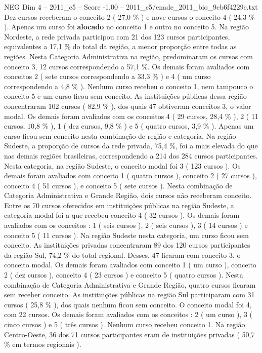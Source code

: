 \begin{textsample}{NEG Dim 4 – 2011\_c5 – Score -1.00 – 2011\_c5/enade\_2011\_bio\_9cb6f4229e.txt}
Dez cursos receberam o conceito 2 ( 27,0 \% ) e nove cursos o conceito 4 ( 24,3 \% ).
Apenas um curso foi \textbf{alocado} no conceito 1 e outro no conceito 5.
Na região Nordeste, a rede privada participou com 21 dos 123 cursos participantes, equivalentes a 17,1 \% do total da região, a menor proporção entre todas as regiões.
Nesta Categoria Administrativa na região, predominaram os cursos com conceito 3, 12 cursos correspondendo a 57,1 \%.
Os demais foram avaliados com conceitos 2 ( sete cursos correspondendo a 33,3 \% ) e 4 ( um curso correspondendo a 4,8 \% ).
Nenhum curso recebeu o conceito 1, nem tampouco o conceito 5 e um curso ficou sem conceito.
As instituições públicas dessa região concentraram 102 cursos ( 82,9 \% ), dos quais 47 obtiveram conceitos 3, o valor modal.
Os demais foram avaliados com os conceitos 4 ( 29 cursos, 28,4 \% ), 2 ( 11 cursos, 10,8 \% ), 1 ( dez cursos, 9,8 \% ) e 5 ( quatro cursos, 3,9 \% ).
Apenas um curso ficou sem conceito nesta combinação de região e categoria.
Na região Sudeste, a proporção de cursos da rede privada, 75,4 \%, foi a mais elevada do que nas demais regiões brasileiras, correspondendo a 214 dos 284 cursos participantes.
Nesta categoria, na região Sudeste, o conceito modal foi 3 ( 123 cursos ).
Os demais foram avaliados com conceito 1 ( quatro cursos ), conceito 2 ( 27 cursos ), conceito 4 ( 51 cursos ), e conceito 5 ( sete cursos ).
Nesta combinação de Categoria Administrativa e Grande Região, dois cursos não receberam conceito.
Entre os 70 cursos oferecidos em instituições públicas na região Sudeste, a categoria modal foi a que recebeu conceito 4 ( 32 cursos ).
Os demais foram avaliados com os conceitos : 1 ( seis cursos ), 2 ( seis cursos ), 3 ( 14 cursos ) e conceito 5 ( 11 cursos ).
Na região Sudeste nesta categoria, um curso ficou sem conceito.
As instituições privadas concentraram 89 dos 120 cursos participantes da região Sul, 74,2 \% do total regional.
Desses, 47 ficaram com conceito 3, o conceito modal.
Os demais foram avaliados com conceito 1 ( um curso ), conceito 2 ( dez cursos ), conceito 4 ( 23 cursos ) e conceito 5 ( quatro cursos ).
Nesta combinação de Categoria Administrativa e Grande Região, quatro cursos ficaram sem receber conceito.
As instituições públicas na região Sul participaram com 31 cursos ( 25,8 \% ), dos quais nenhum ficou sem conceito.
O conceito modal foi 4, com 22 cursos.
Os demais foram avaliados com os conceitos : 2 ( um curso ), 3 ( cinco cursos ) e 5 ( três cursos ).
Nenhum curso recebeu conceito 1.
Na região Centro-Oeste, 36 dos 71 cursos participantes eram de instituições privadas ( 50,7 \% em termos regionais ).

\end{textsample}
